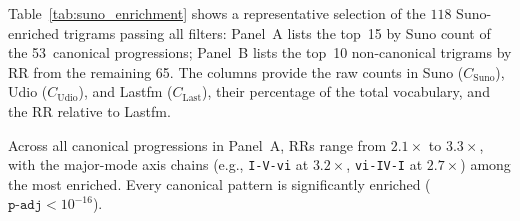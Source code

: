 \documentclass{article}
\begin{document}
Table~\ref{tab:suno_enrichment} shows a representative selection of the $118$ Suno-enriched trigrams passing all filters: Panel~A lists the top~15 by Suno count of the 53~canonical progressions; %
Panel~B lists the top~10 non-canonical trigrams by RR from the remaining 65. The columns provide the raw counts in Suno ($C_\text{Suno}$), Udio ($C_\text{Udio}$), and Lastfm ($C_\text{Last}$), their percentage of the total vocabulary, and the RR relative to Lastfm.

Across all canonical progressions in Panel~A, RRs range from $2.1\times$ to $3.3\times$, with the major-mode axis chains (e.g., \texttt{I-V-vi} at $3.2\times$, \texttt{vi-IV-I} at $2.7\times$) among the most enriched. Every canonical pattern is significantly enriched ($\texttt{p-adj} < 10^{-16}$).
\end{document}
